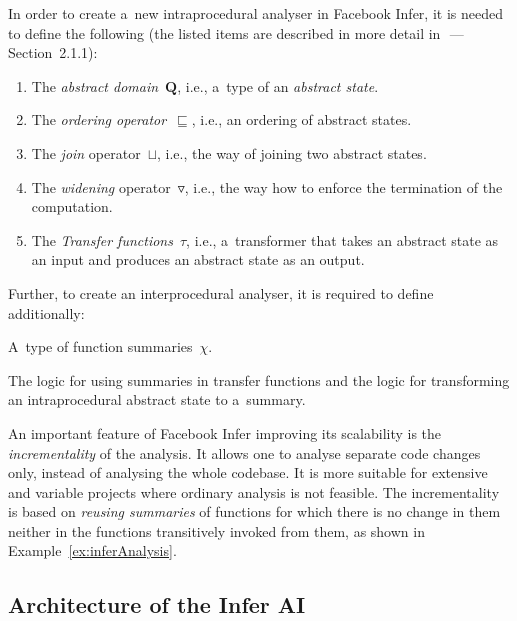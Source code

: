 \documentclass{ExcelAtFIT}
\theoremstyle{definition}
\begin{document}
In order to create a~new intraprocedural analyser in Facebook Infer, it is needed to define the following (the listed items are described in more detail in~\cite{harmimBP}\,---\,Section~2.1.1):
\vspace{-.5em}
\begin{enumerate}
    \item The \emph{abstract domain}~$ \boldsymbol{Q} $, i.e., a~type of an \emph{abstract state}.

    \item The \emph{ordering operator}~$ \sqsubseteq $, i.e., an ordering of abstract states.

    \item The \emph{join} operator~$ \sqcup $, i.e., the way of joining two abstract states.

    \item The \emph{widening} operator~$ \triangledown $, i.e., the way how to enforce the termination of the computation.

    \item The \emph{Transfer functions}~$ \tau $, i.e., a~transformer that takes an abstract state as an input and produces an abstract state as an output.
\end{enumerate}
\vspace{-.5em}
Further, to create an interprocedural analyser, it is required to define additionally:
\begin{enumerate*}[label={(\roman*)}]
    \item A~type of function summaries~$ \chi $.

    \item The logic for using summaries in transfer functions and the logic for transforming an intraprocedural abstract state to a~summary.
\end{enumerate*}
\vspace{-.5em}

An important feature of Facebook Infer improving its scalability is the \emph{incrementality} of the analysis. It allows one to analyse separate code changes only, instead of analysing the whole codebase. It is more suitable for extensive and variable projects where ordinary analysis is not feasible. The incrementality is based on \emph{reusing summaries} of functions for which there is no change in them neither in the functions transitively invoked from them, as shown in Example~\ref{ex:inferAnalysis}.

\subsection{Architecture of the Infer AI}
\label{sec:fbinferArch}
\end{document}
